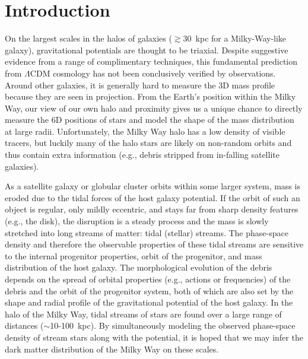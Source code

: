 \documentclass[letterpaper,12pt,preprint]{aastex}
\begin{document}
\keywords{
}


\section{Introduction}\label{sec:introduction}

On the largest scales in the halos of galaxies ($\gtrsim$30~kpc for a Milky-Way-like galaxy), gravitational potentials are thought to be triaxial. Despite suggestive evidence from a range of complimentary techniques, this fundamental prediction from $\Lambda$CDM cosmology has not been conclusively verified by observations. Around other galaxies, it is generally hard to measure the 3D mass profile because they are seen in projection. From the Earth's position within the Milky Way, our view of our own halo and proximity gives us a unique chance to directly measure the 6D positions of stars and model the shape of the mass distribution at large radii. Unfortunately, the Milky Way halo has a low density of visible tracers, but luckily many of the halo stars are likely on non-random orbits and thus contain extra information (e.g., debris stripped from in-falling satellite galaxies).

As a satellite galaxy or globular cluster orbits within some larger system, mass is eroded due to the tidal forces of the host galaxy potential. If the orbit of such an object is regular, only mildly eccentric, and stays far from sharp density features (e.g., the disk), the disruption is a steady process and the mass is slowly stretched into long streams of matter: tidal (stellar) streams. The phase-space density and therefore the observable properties of these tidal streams are sensitive to the internal progenitor properties, orbit of the progenitor, and  mass distribution of the host galaxy. The morphological evolution of the debris depends on the spread of orbital properties (e.g., actions or frequencies) of the debris and the orbit of the progenitor system, both of which are also set by the shape and radial profile of the gravitational potential of the host galaxy. In the halo of the Milky Way, tidal streams of stars are found over a large range of distances ($\sim$10-100~kpc). By simultaneously modeling the observed phase-space density of stream stars along with the potential, it is hoped that we may infer the dark matter distribution of the Milky Way on these scales.
\end{document}
